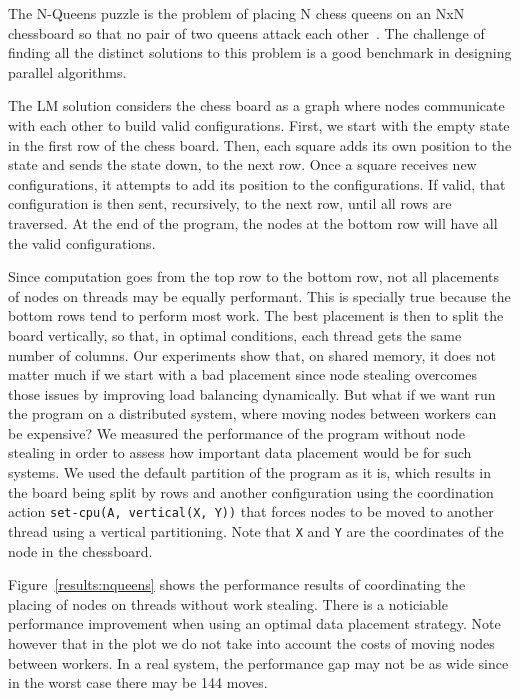 The N-Queens puzzle is the problem of placing N chess queens on an NxN
chessboard so that no pair of two queens attack each
other~\cite{8queens}. The challenge of finding all the
distinct solutions to this problem is a good benchmark in designing
parallel algorithms.

The LM solution considers the chess board as a graph where nodes communicate
with each other to build valid configurations. First, we start with the empty
state in the first row of the chess board. Then, each square adds its own
position to the state and sends the state down, to the next row. Once a square
receives new configurations, it attempts to add its position to the
configurations. If valid, that configuration is then sent, recursively, to the
next row, until all rows are traversed. At the end of the program, the nodes at
the bottom row will have all the valid configurations.

Since computation goes from the top row to the bottom row, not all placements of
nodes on threads may be equally performant. This is specially true because the
bottom rows tend to perform most work. The best placement is then to split the
board vertically, so that, in optimal conditions, each thread gets the same
number of columns.  Our experiments show that, on shared memory, it does not
matter much if we start with a bad placement since node stealing overcomes those
issues by improving load balancing dynamically. But what if we want run the
program on a distributed system, where moving nodes between workers can be
expensive? We measured the performance of the program without node stealing in
order to assess how important data placement would be for such systems.
We used the default partition of the program as it is, which results in the board being
split by rows and another configuration using the coordination action
\texttt{set-cpu(A, vertical(X, Y))} that forces nodes to be moved to another
thread using a vertical partitioning. Note that \texttt{X} and \texttt{Y} are
the coordinates of the node in the chessboard.

Figure~\ref{results:nqueens} shows the performance results of coordinating the
placing of nodes on threads without work stealing. There is a noticiable
performance improvement when using an optimal data placement strategy. Note
however that in the plot we do not take into account the costs of moving
nodes between workers. In a real system, the performance gap may not be as wide
since in the worst case there may be 144 moves.

